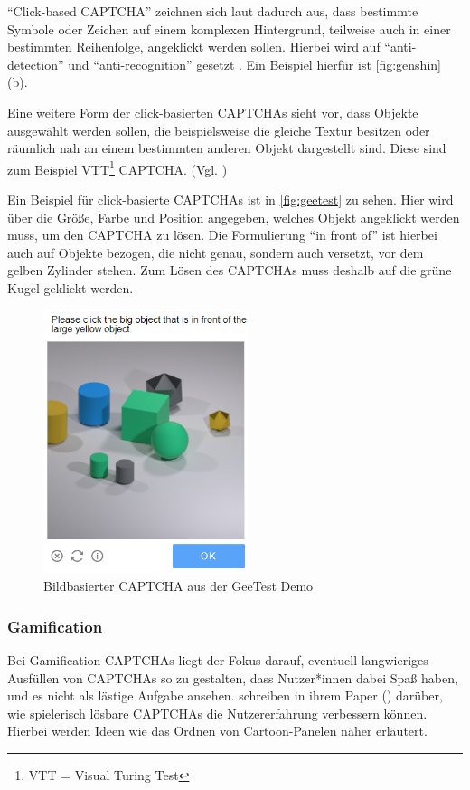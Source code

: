 ``Click-based CAPTCHA'' zeichnen sich laut \citeauthor{surveyofresearch} dadurch aus, dass bestimmte Symbole oder Zeichen auf einem komplexen Hinter\-grund, 
teilweise auch in einer bestimmten Reihenfolge, angeklickt werden sollen.
Hierbei wird auf ``anti-detection'' und ``anti-recognition'' gesetzt \cite[p.77]{surveyofresearch}. 
Ein Beispiel hierfür ist \ref{fig:genshin} (b).

Eine weitere Form der click-basierten CAPTCHAs sieht vor, dass Objekte ausgewählt werden sollen,
die beispielsweise die gleiche Textur besitzen oder räumlich nah an einem bestimmten anderen Objekt dargestellt sind. 
Diese sind zum Beispiel VTT\footnote[2]{VTT = Visual Turing Test} CAPTCHA. (Vgl. \cite[p.78]{surveyofresearch})

Ein Beispiel für click-basierte CAPTCHAs ist in \autoref{fig:geetest} zu sehen.
Hier wird über die Größe, Farbe und Position angegeben, welches Objekt angeklickt werden muss, um den CAPTCHA zu lösen.
Die Formulierung ``in front of'' ist hierbei auch auf Objekte bezogen, die nicht genau, sondern auch versetzt, vor dem gelben Zylinder stehen.
Zum Lösen des CAPTCHAs muss deshalb auf die grüne Kugel geklickt werden.

\begin{figure}[h!]
        \centering
        \includegraphics[width=6cm]{gfx/mygraphics/raeumlich.png} 
    \caption{Bildbasierter CAPTCHA aus der GeeTest Demo}
    \label{fig:geetest}
\end{figure}

\subsubsection*{Gamification}
Bei Gamification CAPTCHAs liegt der Fokus darauf, eventuell langwieriges Ausfüllen von CAPTCHAs so zu gestalten, dass Nutzer*innen dabei Spaß haben,
und es nicht als lästige Aufgabe ansehen.
\citeauthor{gamified} schreiben in ihrem Paper  (\cite{gamified}) darüber, wie spielerisch lösbare CAPTCHAs die Nutzererfahrung verbessern können.
Hierbei werden Ideen wie das Ordnen von Cartoon-Panelen näher erläutert.

